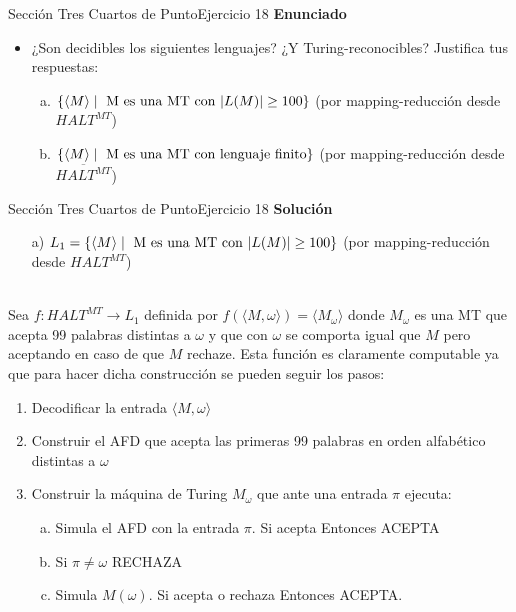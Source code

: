 \documentclass[10pt, envcountsect, presentation, aspectratio=169]{beamer}
\begin{document}

\begin{frame}{Sección Tres Cuartos de Punto}{Ejercicio 18}
    \textbf{Enunciado}
    \begin{itemize}
        \item ¿Son decidibles los siguientes lenguajes? ¿Y Turing-reconocibles? Justifica tus respuestas:
        \begin{enumerate}[a)]
            \item $\{\langle M \rangle \mid \hbox{ M es una MT con } |L(M)| \geq 100\}$ (por mapping-reducción desde $HALT^{MT}$)
            \item $\{\langle M \rangle \mid \hbox{ M es una MT con lenguaje finito}  \}$ (por mapping-reducción desde $\overline{HALT^{MT}}$)
        \end{enumerate}
    \end{itemize}
\end{frame}


\begin{frame}{Sección Tres Cuartos de Punto}{Ejercicio 18}
    \textbf{Solución}\\
    \begin{itemize}
        \item[a)] $L_1 = \{\langle M \rangle \mid \hbox{ M es una MT con } |L(M)| \geq 100\}$ (por mapping-reducción desde $HALT^{MT}$)\\~\\
    \end{itemize}
    Sea $f: HALT^{MT} \rightarrow L_1$ definida por $f(\langle M, \omega \rangle) = \langle M_{\omega} \rangle$ donde $M_{\omega}$ es una MT que acepta 99 palabras distintas a $\omega$ y que con $\omega$ se comporta igual que $M$ pero aceptando en caso de que $M$ rechaze.
    Esta función es claramente computable ya que para hacer dicha construcción se pueden seguir los pasos:
    \begin{enumerate}
        \item Decodificar la entrada $\langle M, \omega \rangle$
        \item Construir el AFD que acepta las primeras 99 palabras en orden alfabético distintas a $\omega$
        \item Construir la máquina de Turing $M_{\omega}$ que ante una entrada $\pi$ ejecuta:
        \begin{enumerate}[a)]
            \item Simula el AFD con la entrada $\pi$. Si acepta Entonces ACEPTA
            \item Si $\pi \neq \omega$ RECHAZA
            \item Simula $M(\omega)$. Si acepta o rechaza Entonces ACEPTA.
        \end{enumerate}
    \end{enumerate}  
\end{frame}
\end{document}
